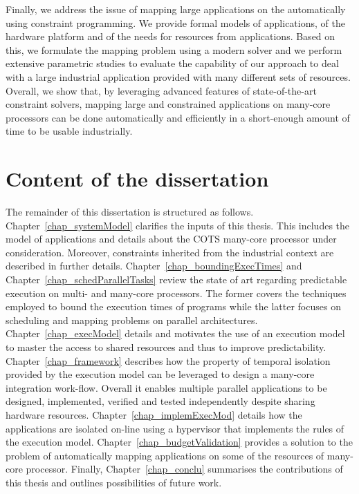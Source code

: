 \documentclass[main.tex]{subfiles}
\begin{document}
Finally, we address the issue of mapping large applications on the \mppalong automatically using constraint programming. We provide formal models of applications, of the hardware platform and of the needs for resources from applications. Based on this, we formulate the mapping problem using a modern solver and we perform extensive parametric studies to evaluate the capability of our approach to deal with a large industrial application provided with many different sets of resources. Overall, we show that, by leveraging advanced features of state-of-the-art constraint solvers, mapping large and constrained applications on many-core processors can be done automatically and efficiently in a short-enough amount of time to be usable industrially.


\section{Content of the dissertation}
The remainder of this dissertation is structured as follows. 
Chapter~\ref{chap_systemModel} clarifies the inputs of this thesis. This includes the model of applications and details about the COTS many-core processor under consideration. Moreover, constraints inherited from the industrial context are described in further details.
Chapter~\ref{chap_boundingExecTimes} and Chapter~\ref{chap_schedParallelTasks} review the state of art regarding predictable execution on multi- and many-core processors. The former covers the techniques employed to bound the execution times of programs while the latter focuses on scheduling and mapping problems on parallel architectures.
Chapter~\ref{chap_execModel} details and motivates the use of an execution model to master the access to shared resources and thus to improve predictability. Chapter~\ref{chap_framework} describes how the property of temporal isolation provided by the execution model can be leveraged to design a many-core integration work-flow. Overall it enables multiple parallel applications to be designed, implemented, verified and tested independently despite sharing hardware resources. 
Chapter~\ref{chap_implemExecMod} details how the applications are isolated on-line using a hypervisor that implements the rules of the execution model. Chapter~\ref{chap_budgetValidation} provides a solution to the problem of automatically mapping applications on some of the resources of many-core processor.
Finally, Chapter~\ref{chap_conclu} summarises the contributions of this thesis and outlines possibilities of future work.





\clearpage
\subbiblio
\end{document}
